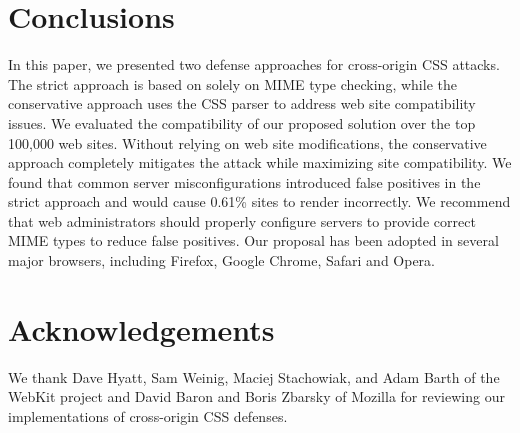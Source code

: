 \documentclass{acm_proc_article-sp}
\begin{document}
\section{Conclusions} \label{sec:conclusion}
In this paper, we presented two defense approaches for cross-origin CSS attacks. The strict approach is based on solely on MIME type
checking, while the conservative approach uses the CSS parser to
address web site compatibility issues. We evaluated the compatibility of our
proposed solution over the top 100,000 web sites. Without relying on web site
modifications, the conservative approach completely mitigates the attack while
maximizing site compatibility. We found that common server misconfigurations
introduced false positives in the strict approach and would cause 0.61\%
sites to render incorrectly. We recommend that web administrators should
properly configure servers to provide correct MIME types to reduce false
positives. Our proposal has been adopted in several major browsers, including
Firefox, Google Chrome, Safari and Opera.

\section*{Acknowledgements}

We thank Dave Hyatt, Sam Weinig, Maciej Stachowiak, and Adam Barth of the
WebKit project and David Baron and Boris Zbarsky of Mozilla for reviewing our implementations of cross-origin CSS defenses.



\end{document}
